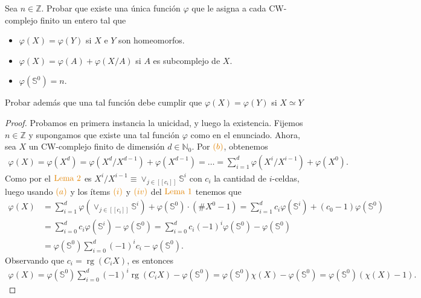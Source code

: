 \documentclass[11pt]{article}
\newcommand{\N}{\mathbb{N}}
\newcommand{\Z}{\mathbb{Z}}
\newcommand{\Ss}{\mathbb{S}}
\newcommand{\nat}[1]{[\![#1]\!]}
\newcommand{\paint}[1]{\color{color}{#1}}
\newenvironment{exercise}[2][Ejercicio]{\begin{trivlist}
\item[\hskip \labelsep \paint{{\bfseries #1}}\hskip \labelsep {\bfseries #2.}]}{\end{trivlist}}
\begin{document}
\begin{exercise}{8} Sea $n \in \Z$. Probar que existe una \'unica funci\'on $\varphi$ que le asigna a cada CW-complejo finito un entero tal que 
\begin{itemize}
\item[(a)] $\varphi(X) = \varphi(Y)$ si $X$ e $Y$ son homeomorfos.
\item[(b)] $\varphi(X) = \varphi(A) + \varphi(X/A)$ si $A$ es subcomplejo de $X$.
\item[(c)] $\varphi(\Ss^0) = n$.
\end{itemize}
Probar adem\'as que una tal funci\'on debe cumplir que $\varphi(X) = \varphi(Y)$ si $X \simeq Y$

\end{exercise}
\begin{proof} Probamos en primera instancia la unicidad, y luego la existencia. Fijemos $n \in \Z$ y supongamos que existe una tal funci\'on $\varphi$ como en el enunciado. Ahora, sea $X$ un CW-complejo finito de dimensi\'on $d \in \N_0$. Por $\paint{(b)}$, obtenemos
\begin{align*}
\varphi(X) = \varphi(X^d) = \varphi(X^d/X^{d-1}) + \varphi(X^{d-1}) = \dots = \sum_{i=1}^d\varphi(X^i/X^{i-1}) + \varphi(X^0).
\end{align*}
Como por el $\paint{\text{Lema $2$}}$ es $X^i/X^{i-1} \equiv \vee_{j \in \nat{c_i}}\Ss^i$ con $c_i$ la cantidad de $i$-celdas, luego usando $\paint{(a)}$ y los \'items $\paint{(i)}$ y $\paint{(iv)}$ del $\paint{\text{Lema $1$}}$ tenemos que
\begin{align*}
\varphi(X) &= \sum_{i=1}^d \varphi(\vee_{j \in \nat{c_i}}\Ss^i) + \varphi(\Ss^0) \cdot (\#X^0-1) = \sum_{i=1}^d c_i\varphi(\Ss^i) + (c_0-1)\varphi(\Ss^0)\\
&= \sum_{i=0}^dc_i \varphi(\Ss^i) - \varphi(\Ss^0) = \sum_{i=0}^dc_i(-1)^i\varphi(\Ss^0) -\varphi(\Ss^0)\\
& = \varphi(\Ss^0)\sum_{i=0}^d(-1)^ic_i - \varphi(\Ss^0).
\end{align*}
Observando que $c_i = \operatorname{rg}(C_iX)$, es entonces
\begin{align*}
\varphi(X) = \varphi(\Ss^0)\sum_{i=0}^d(-1)^i\operatorname{rg}(C_iX) - \varphi(\Ss^0) = \varphi(\Ss^0) \chi(X) - \varphi(\Ss^0) = \varphi(\Ss^0)(\chi(X)-1).
\end{align*}

\end{proof}
\end{document}
